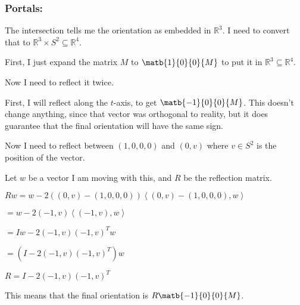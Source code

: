 \bigskip

\subsubsection{Portals:}

The intersection tells me the orientation as embedded in $\mathbb{R}^3$. I need to convert that to $\mathbb{R}^3 \times S^2 \subseteq \mathbb{R}^4$.

First, I just expand the matrix $M$ to $\matb{1}{0}{0}{M}$ to put it in $\mathbb{R}^3 \subseteq \mathbb{R}^4$.

Now I need to reflect it twice.

First, I will reflect along the $t$-axis, to get $\matb{-1}{0}{0}{M}$. This doesn't change anything, since that vector was orthogonal to reality, but it does guarantee that the final orientation will have the same sign.

Now I need to reflect between $(1,0,0,0)$ and $(0,v)$ where $v \in S^2$ is the position of the vector.

Let $w$ be a vector I am moving with this, and $R$ be the reflection matrix.

$Rw = w - 2((0,v)-(1,0,0,0))\left<(0,v)-(1,0,0,0),w\right>$

$= w - 2(-1,v)\left<(-1,v),w\right>$

$= Iw - 2(-1,v)(-1,v)^Tw$

$= (I - 2(-1,v)(-1,v)^T)w$

$R = I - 2(-1,v)(-1,v)^T$

This means that the final orientation is $R\matb{-1}{0}{0}{M}$.